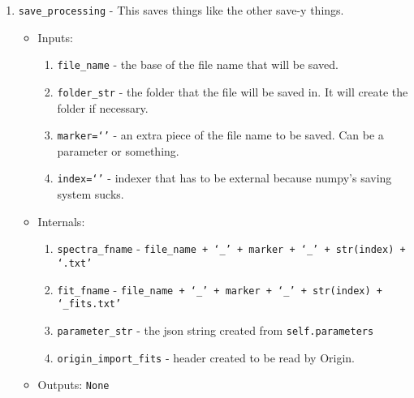 \documentclass{article}
\newcommand{\code}{\texttt}
\begin{document}
\begin{enumerate}
	\item \code{save\_processing} - This saves things like the other save-y things.
	\begin{itemize}
		\item Inputs:
		\begin{enumerate}
			\item \code{file\_name} - the base of the file name that will be saved.
			\item \code{folder\_str} - the folder that the file will be saved in.  It will create the folder if necessary.
			\item \code{marker=`'} - an extra piece of the file name to be saved.  Can be a parameter or something.
			\item \code{index=`'} - indexer that has to be external because numpy's saving system sucks.
		\end{enumerate}
		\item Internals:
		\begin{enumerate}
			\item \code{spectra\_fname} - \code{file\_name + `\_' + marker + `\_' + str(index) + `.txt'}
			\item \code{fit\_fname} - \code{file\_name + `\_' + marker + `\_' + str(index) + `\_fits.txt'}
			\item \code{parameter\_str} - the json string created from \code{self.parameters}
			\item \code{origin\_import\_fits} - header created to be read by Origin.
		\end{enumerate}
		\item Outputs: \code{None}
	\end{itemize}
\end{enumerate}
\end{document}
